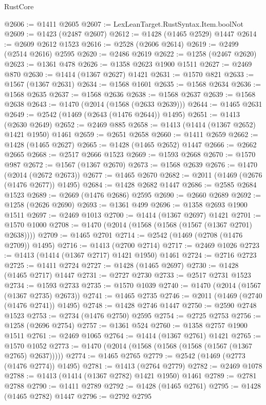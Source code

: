 \begin{lexlean}{RustCore}
\begin{coremodule}
@2606 := @1411 @2605
@2607 := LexLeanTarget.RustSyntax.Item.boolNot
@2609 := @1423 (@2487 @2607)
@2612 := @1428 (@1465 @2529) @1447
@2614 := @2609 @2612 @1523
@2616 := @2528 (@2606 @2614)
@2619 := @2499 (@2514 @2616) @2595
@2620 := @2486 @2619
@2622 := @1258 (@2467 @2620)
@2623 := @1361 @478
@2626 := @1358 @2623 @1900 @1511
@2627 := @2469 @870
@2630 := @1414 (@1367 @2627) @1421
@2631 := @1570 @821
@2633 := @1567 (@1367 @2631)
@2634 := @1568 @1601
@2635 := @1568 @2634
@2636 := @1568 @2635
@2637 := @1568 @2636
@2638 := @1568 @2637
@2639 := @1568 @2638
@2643 := @1470 (@2014 (@1568 (@2633 @2639)))
@2644 := @1465 @2631
@2649 := @2542 (@1469 (@2643 (@1476 @2644)) @1495)
@2651 := @1413 (@2630 @2649)
@2652 := @2469 @885
@2658 := @1413 (@1414 (@1367 @2652) @1421 @1950) @1461
@2659 := @2651 @2658
@2660 := @1411 @2659
@2662 := @1428 (@1465 @2627)
@2665 := @1428 (@1465 @2652) @1447
@2666 := @2662 @2665
@2668 := @2517 @2666 @1523
@2669 := @1593 @2668
@2670 := @1570 @987
@2672 := @1567 (@1367 @2670)
@2673 := @1568 @2639
@2676 := @1470 (@2014 (@2672 @2673))
@2677 := @1465 @2670
@2682 := @2011 (@1469 (@2676 (@1476 @2677)) @1495)
@2684 := @1428 @2682 @1447
@2686 := @2585 @2684 @1523
@2689 := @2669 (@1476 @2686) @2595
@2690 := @2660 @2689
@2692 := @1258 (@2626 @2690)
@2693 := @1361 @499
@2696 := @1358 @2693 @1900 @1511
@2697 := @2469 @1013
@2700 := @1414 (@1367 @2697) @1421
@2701 := @1570 @1000
@2708 := @1470 (@2014 (@1568 (@1568 (@1567 (@1367 @2701) @2638))))
@2709 := @1465 @2701
@2714 := @2542 (@1469 (@2708 (@1476 @2709)) @1495)
@2716 := @1413 (@2700 @2714)
@2717 := @2469 @1026
@2723 := @1413 (@1414 (@1367 @2717) @1421 @1950) @1461
@2724 := @2716 @2723
@2725 := @1411 @2724
@2727 := @1428 (@1465 @2697)
@2730 := @1428 (@1465 @2717) @1447
@2731 := @2727 @2730
@2733 := @2517 @2731 @1523
@2734 := @1593 @2733
@2735 := @1570 @1039
@2740 := @1470 (@2014 (@1567 (@1367 @2735) @2673))
@2741 := @1465 @2735
@2746 := @2011 (@1469 (@2740 (@1476 @2741)) @1495)
@2748 := @1428 @2746 @1447
@2750 := @2590 @2748 @1523
@2753 := @2734 (@1476 @2750) @2595
@2754 := @2725 @2753
@2756 := @1258 (@2696 @2754)
@2757 := @1361 @524
@2760 := @1358 @2757 @1900 @1511
@2761 := @2469 @1065
@2764 := @1414 (@1367 @2761) @1421
@2765 := @1570 @1052
@2773 := @1470 (@2014 (@1568 (@1568 (@1568 (@1567 (@1367 @2765) @2637)))))
@2774 := @1465 @2765
@2779 := @2542 (@1469 (@2773 (@1476 @2774)) @1495)
@2781 := @1413 (@2764 @2779)
@2782 := @2469 @1078
@2788 := @1413 (@1414 (@1367 @2782) @1421 @1950) @1461
@2789 := @2781 @2788
@2790 := @1411 @2789
@2792 := @1428 (@1465 @2761)
@2795 := @1428 (@1465 @2782) @1447
@2796 := @2792 @2795

\end{coremodule}
\end{lexlean}
